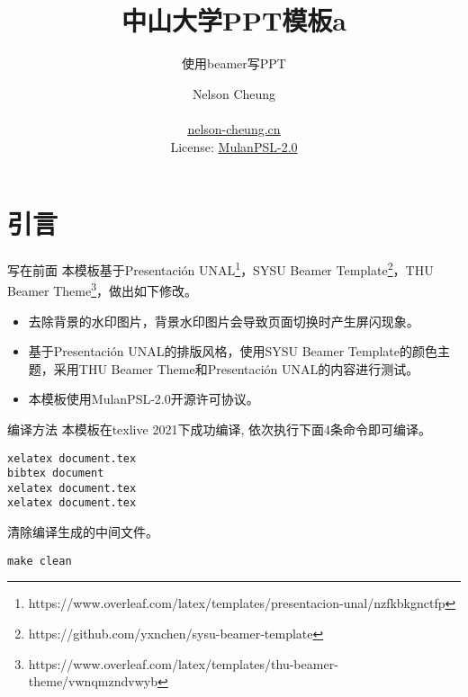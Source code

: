 \documentclass{libs/format}
\title[sysu ppt template]{中山大学PPT模板a}
\subtitle{使用beamer写PPT}
\institute[Sun Yat-Sen University]{
  计算机学院 \\ 
  中山大学}
\date[\ctoday]{\ctoday}
\begin{document}


\author[Nelson Cheung]{
  Nelson Cheung \\\medskip
  {} \\
  {\url{nelson-cheung.cn}} \\
  {\small{License: \href{https://license.coscl.org.cn/MulanPSL2/}{MulanPSL-2.0}}}
}

\begin{frame}
  \titlepage
\end{frame}
\setcounter{framenumber}{0}

\begin{frame}
  \tableofcontents[sectionstyle=show,subsectionstyle=show/shaded/hide,subsubsectionstyle=show/shaded/hide]
  \addtocounter{framenumber}{-1}
\end{frame}



\section{引言}

\begin{frame}{写在前面}
  本模板基于Presentación UNAL\footnote[frame]{https://www.overleaf.com/latex/templates/presentacion-unal/nzfkbkgnctfp}，SYSU Beamer Template\footnote[frame]{https://github.com/yxnchen/sysu-beamer-template}，THU Beamer Theme\footnote[frame]{https://www.overleaf.com/latex/templates/thu-beamer-theme/vwnqmzndvwyb}，做出如下修改。
  \begin{itemize}
    \item 去除背景的水印图片，背景水印图片会导致页面切换时产生屏闪现象。
    \item 基于Presentación UNAL的排版风格，使用SYSU Beamer Template的颜色主题，采用THU Beamer Theme和Presentación UNAL的内容进行测试。
    \item 本模板使用MulanPSL-2.0开源许可协议。
  \end{itemize}
\end{frame}

\begin{frame}[fragile]{编译方法}
  本模板在texlive 2021下成功编译, 依次执行下面4条命令即可编译。
  \begin{lstlisting}
xelatex document.tex
bibtex document
xelatex document.tex
xelatex document.tex\end{lstlisting}
  清除编译生成的中间文件。
  \begin{lstlisting}
make clean\end{lstlisting}  

\end{frame}
\end{document}
